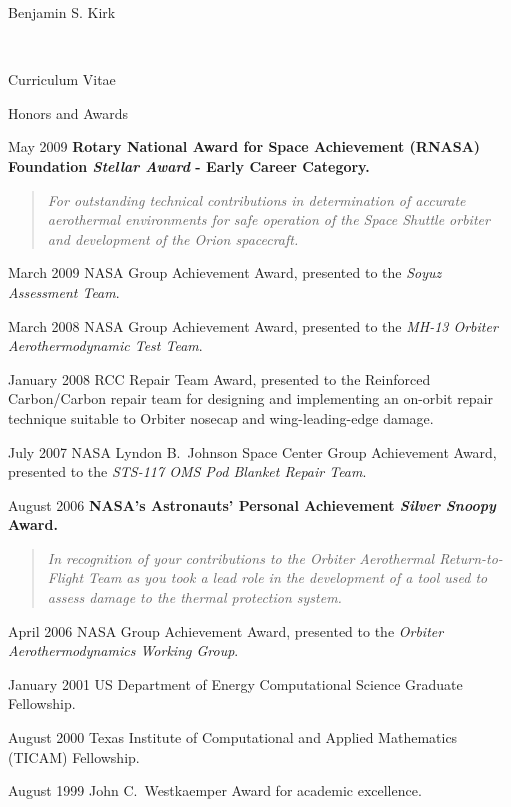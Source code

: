 \documentclass[10pt]{report}
\begin{document}
\begin{cv}{\centerline{\Large Benjamin S. Kirk}\\
    \centerline{\large Curriculum Vitae}}
\begin{cvlist}{Honors and Awards}
    \item[May 2009]
      \textbf{Rotary National Award for Space Achievement (RNASA) Foundation {\em Stellar Award} - Early Career Category.}
      \begin{quote}
        \em For outstanding technical contributions in determination of accurate aerothermal environments for safe operation of the Space Shuttle orbiter and development of the Orion spacecraft.
      \end{quote}


    \item[March 2009]
    NASA Group Achievement Award, presented to the {\em Soyuz Assessment Team}.

    \item[March 2008]
    NASA Group Achievement Award, presented to the {\em MH-13 Orbiter Aerothermodynamic Test Team}.

    \item[January 2008]
     RCC Repair Team Award, presented to the Reinforced Carbon/Carbon repair team for designing and implementing an on-orbit repair technique suitable to Orbiter nosecap and wing-leading-edge damage.

    \item[July 2007]
      NASA Lyndon B.~Johnson Space Center Group Achievement Award, presented to the {\em STS-117 OMS Pod Blanket Repair Team}.

    \item[August 2006]
      \textbf{NASA's Astronauts' Personal Achievement {\em Silver Snoopy} Award.}

      \begin{quote}
        \em In recognition of your contributions to the Orbiter Aerothermal Return-to-Flight Team as you took a lead role in the development of a tool used to assess damage to the thermal protection system.
      \end{quote}

    \item[April 2006]
      NASA Group Achievement Award, presented to the {\em Orbiter Aerothermodynamics Working Group}.

    \item[January 2001]
      US Department of Energy Computational Science Graduate Fellowship.

    \item[August 2000]
      Texas Institute of Computational and Applied Mathematics (TICAM) Fellowship.

    \item[August 1999]
      John C.\ Westkaemper Award for academic excellence.
  \end{cvlist}



\end{cv}
\end{document}
